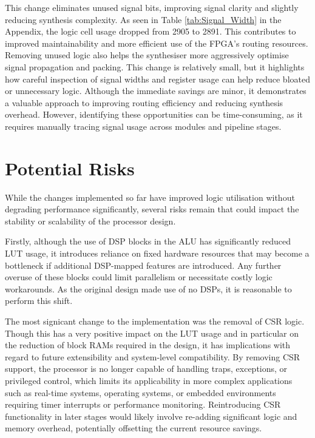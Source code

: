\documentclass[a4paper,10pt]{article}
\begin{document}
This change eliminates unused signal bits, 
improving signal clarity and slightly reducing synthesis complexity. 
As seen in Table \ref{tab:Signal_Width} in the Appendix,
the logic cell usage dropped from 2905 to 2891.
This contributes to improved maintainability 
and more efficient use of the FPGA's routing resources. 
Removing unused logic also helps the synthesiser 
more aggressively optimise signal propagation and packing.
This change is relatively small, but it highlights how careful inspection 
of signal widths and register usage can help reduce bloated or unnecessary logic. 
Although the immediate savings are minor, 
it demonstrates a valuable approach to 
improving routing efficiency and reducing synthesis overhead. 
However, identifying these opportunities can be time-consuming, 
as it requires manually tracing signal usage across modules and pipeline stages.

\section{Potential Risks}
\label{sec:Potential_Risks}

While the changes implemented so far have improved logic utilisation 
without degrading performance significantly, several risks remain that could impact 
the stability or scalability of the processor design.

Firstly, although the use of DSP blocks in the ALU has significantly 
reduced LUT usage, it introduces reliance on fixed hardware resources 
that may become a bottleneck if additional DSP-mapped features are introduced. 
Any further overuse of these blocks could limit parallelism or 
necessitate costly logic workarounds. 
As the original design made use of no DSPs,
it is reasonable to perform this shift.

The most signicant change to the implementation was the removal of CSR logic.
Though this has a very positive impact on the LUT usage and in particular
on the reduction of block RAMs required in the design,
it has implications with regard to 
future extensibility and system-level compatibility. 
By removing CSR support, the processor is no longer capable of handling traps, 
exceptions, or privileged control, which limits its applicability 
in more complex applications such as real-time systems, operating systems, 
or embedded environments requiring timer interrupts or performance monitoring. 
Reintroducing CSR functionality in later stages would likely involve 
re-adding significant logic and memory overhead, 
potentially offsetting the current resource savings.
\end{document}
